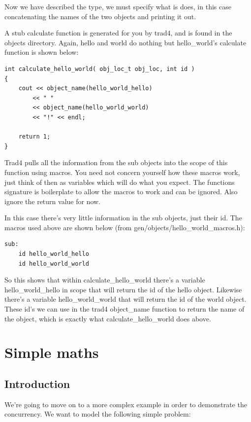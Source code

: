 \documentclass{report}
\begin{document}
Now we have described the type, we must specify what is does, in this case concatenating the names of the two objects and printing it out.

A stub calculate function is generated for you by trad4, and is found in the objects directory. Again, hello and world do nothing but hello_world's calculate function is shown below:

\begin{verbatim}
int calculate_hello_world( obj_loc_t obj_loc, int id )
{
    cout << object_name(hello_world_hello) 
        << " " 
        << object_name(hello_world_world) 
        << "!" << endl;

    return 1;
}
\end{verbatim}

Trad4 pulls all the information from the sub objects into the scope of this function using macros. You need not concern yourself how these macros work, just think of then as variables which will do what you expect. The functions signature is boilerplate to allow the macros to work and can be ignored. Also ignore the return value for now.

In this case there's very little information in the sub objects, just their id. The macros used above are shown below (from gen/objects/hello_world_macros.h):

\begin{verbatim}
sub:
    id hello_world_hello
    id hello_world_world
\end{verbatim}

So this shows that within calculate_hello_world there's a variable hello_world_hello in scope that will return the id of the hello object. Likewise there's a variable hello_world_world that will return the id of the world object. These id's we can use in the trad4 object_name function to return the name of the object, which is exactly what calculate_hello_world does above.

\chapter{Simple maths}

\section{Introduction}

We're going to move on to a more complex example in order to demonstrate the concurrency. We want to model the following simple problem:
\end{document}
